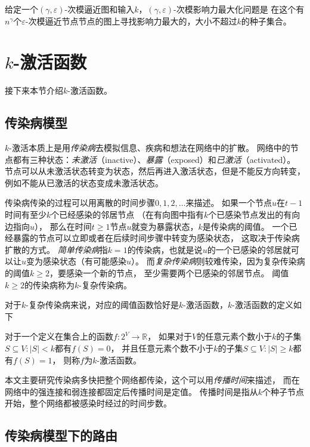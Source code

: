 \begin{definition}
给定一个$(\gamma,\varepsilon)$-次模逼近图和输入$k$，$(\gamma,\varepsilon)$-次模影响力最大化问题是
在这个有$n^{\gamma}$个$\varepsilon$-次模逼近节点节点的图上寻找影响力最大的，大小不超过$k$的种子集合。
\end{definition}


\section{$k$-激活函数}
接下来本节介绍$k$-激活函数。

\subsection{传染病模型}
$k$-激活本质上是用{\it 传染病}去模拟信息、疾病和想法在网络中的扩散。
网络中的节点都有三种状态：{\it 未激活}（inactive）、{\it 暴露}（exposed）和{\it 已激活}（activated）。
节点可以从未激活状态转变为状态，然后再进入激活状态，但是不能反方向转变，例如不能从已激活的状态变成未激活状态。

传染病传染的过程可以用离散的时间步骤$0,1,2,\ldots$来描述。
如果一个节点$u$在$t-1$时间有至少$k$个已经感染的邻居节点
（在有向图中指有$k$个已感染节点发出的有向边指向$u$），
那么在时间$t\ge 1$节点$u$就变为暴露状态，$k$是传染病的阈值。
一个已经暴露的节点可以立即或者在后续时间步骤中转变为感染状态，
这取决于传染病扩散的方式。
{\it 简单传染病}指$k=1$的传染病，也就是说$u$的一个已感染的邻居就可以让$u$变为感染状态（有可能感染$u$）。
而{\it 复杂传染病}则较难传染，因为复杂传染病的阈值$k \geq 2$，要感染一个新的节点，
至少需要两个已感染的邻居节点。
阈值$k\ge 2$的传染病称为$k$-复杂传染病。

对于$k$-复杂传染病来说，对应的阈值函数恰好是$k$-激活函数，$k$-激活函数的定义如下
\begin{definition}[$k$-激活]
对于一个定义在集合上的函数$f:2^V \to \mathbb{R}$，
如果对于$V$的任意元素个数小于$k$的子集$S \subseteq V:|S|<k$都有$f(S) = 0$，
并且任意元素个数不小于$k$的子集$S \subseteq V:|S|\geq k$都有$f(S) = 1$，
则称$f$为$k$-激活函数。
\end{definition}


本文主要研究传染病多快把整个网络都传染，这个可以用{\it 传播时间}来描述，
而在网络中的强连接和弱连接都固定后传播时间是定值。
传播时间是指从$k$个种子节点开始，整个网络都被感染时经过的时间步数。

\subsection{传染病模型下的路由}

